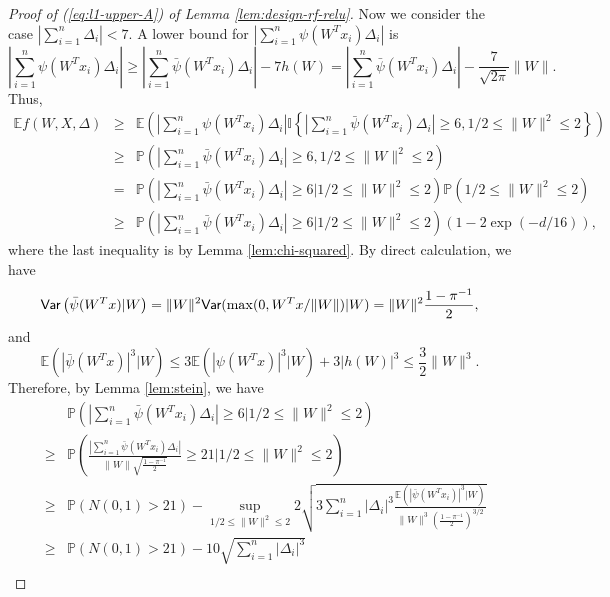 \begin{proof}[Proof of (\ref{eq:l1-upper-A}) of Lemma \ref{lem:design-rf-relu}]
Now we consider the case $\left|\sum_{i=1}^n\Delta_i\right|< 7$. A lower bound for $\left|\sum_{i=1}^n\psi(W^Tx_i)\Delta_i\right|$ is
\begin{equation}
\left|\sum_{i=1}^n\psi(W^Tx_i)\Delta_i\right| \geq \left|\sum_{i=1}^n\bar{\psi}(W^Tx_i)\Delta_i\right| - 7h(W) = \left|\sum_{i=1}^n\bar{\psi}(W^Tx_i)\Delta_i\right| - \frac{7}{\sqrt{2\pi}}\|W\|. \label{eq:seven}
\end{equation}
Thus,
\begin{eqnarray}
\nonumber \mathbb{E}f(W,X,\Delta) &\geq& \mathbb{E}\left(\left|\sum_{i=1}^n\psi(W^Tx_i)\Delta_i\right|\mathbb{I}\left\{\left|\sum_{i=1}^n\bar{\psi}(W^Tx_i)\Delta_i\right|\geq 6, 1/2\leq \|W\|^2\leq 2\right\}\right) \\
\nonumber &\geq& \mathbb{P}\left(\left|\sum_{i=1}^n\bar{\psi}(W^Tx_i)\Delta_i\right|\geq 6, 1/2\leq \|W\|^2\leq 2\right) \\
\nonumber &=& \mathbb{P}\left(\left|\sum_{i=1}^n\bar{\psi}(W^Tx_i)\Delta_i\right|\geq 6\Big|1/2\leq \|W\|^2\leq 2\right)\mathbb{P}\left(1/2\leq \|W\|^2\leq 2\right) \\
\nonumber &\geq& \mathbb{P}\left(\left|\sum_{i=1}^n\bar{\psi}(W^Tx_i)\Delta_i\right|\geq 6\Big|1/2\leq \|W\|^2\leq 2\right)\left(1-2\exp(-d/16)\right),
\end{eqnarray}
where the last inequality is by Lemma \ref{lem:chi-squared}. By direct calculation, we have
\begin{equation}
\Var\left(\bar{\psi}(W^Tx)|W\right)=\|W\|^2\Var(\max(0,W^Tx/\|W\|)|W)=\|W\|^2\frac{1-\pi^{-1}}{2}, \label{eq:cond-var-X-W}
\end{equation}
and
$$\mathbb{E}\left(|\bar{\psi}(W^Tx)|^3|W\right) \leq 3\mathbb{E}\left(|\psi(W^Tx)|^3|W\right)+3|h(W)|^3 \leq \frac{3}{2}\|W\|^3.$$
Therefore, by Lemma \ref{lem:stein}, we have
\begin{eqnarray}
\nonumber && \mathbb{P}\left(\left|\sum_{i=1}^n\bar{\psi}(W^Tx_i)\Delta_i\right|\geq 6\Big|1/2\leq \|W\|^2\leq 2\right) \\
\nonumber &\geq& \mathbb{P}\left(\frac{\left|\sum_{i=1}^n\bar{\psi}(W^Tx_i)\Delta_i\right|}{\|W\|\sqrt{\frac{1-\pi^{-1}}{2}}}\geq 21\Bigg|1/2\leq \|W\|^2\leq 2\right) \\
\nonumber &\geq& \mathbb{P}\left(N(0,1)>21\right) - \sup_{1/2\leq \|W\|^2\leq 2} 2\sqrt{3\sum_{i=1}^n|\Delta_i|^3\frac{\mathbb{E}\left(|\bar{\psi}(W^Tx_i)|^3|W\right)}{\|W\|^3\left(\frac{1-\pi^{-1}}{2}\right)^{3/2}}} \\
\nonumber &\geq& \mathbb{P}\left(N(0,1)>21\right) - 10\sqrt{\sum_{i=1}^n|\Delta_i|^3} \\

\end{eqnarray}
\end{proof}
